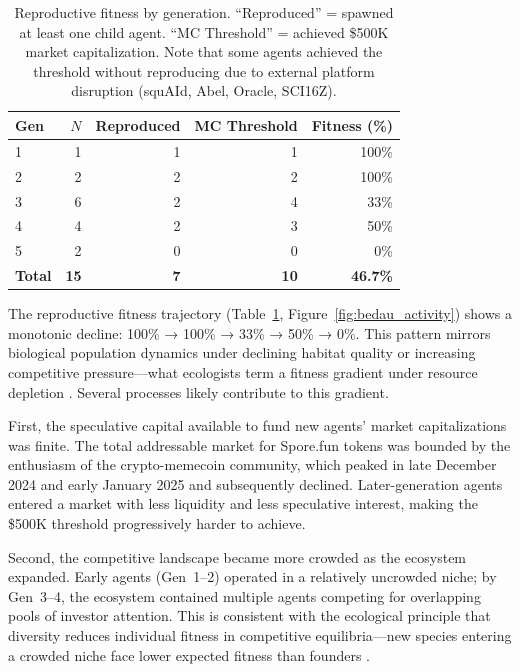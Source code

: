 \begin{table}[ht]
\centering
\caption{Reproductive fitness by generation. ``Reproduced'' = spawned at least one child agent. ``MC Threshold'' = achieved \$500K market capitalization. Note that some agents achieved the threshold without reproducing due to external platform disruption (squAId, Abel, Oracle, SCI16Z).}
\label{tab:rep-fitness}
\small
\begin{tabular}{lrrrr}
\toprule
Gen & $N$ & Reproduced & MC Threshold & Fitness (\%) \\
\midrule
1 & 1 & 1 & 1 & 100\% \\
2 & 2 & 2 & 2 & 100\% \\
3 & 6 & 2 & 4 & 33\% \\
4 & 4 & 2 & 3 & 50\% \\
5 & 2 & 0 & 0 & 0\% \\
\midrule
\textbf{Total} & \textbf{15} & \textbf{7} & \textbf{10} & \textbf{46.7\%} \\
\bottomrule
\end{tabular}
\end{table}

The reproductive fitness trajectory (Table~\ref{tab:rep-fitness}, Figure~\ref{fig:bedau_activity}) shows a monotonic decline: 100\% → 100\% → 33\% → 50\% → 0\%. This pattern mirrors biological population dynamics under declining habitat quality or increasing competitive pressure---what ecologists term a fitness gradient under resource depletion \cite{Stearns1992}. Several processes likely contribute to this gradient.

First, the speculative capital available to fund new agents' market capitalizations was finite. The total addressable market for Spore.fun tokens was bounded by the enthusiasm of the crypto-memecoin community, which peaked in late December 2024 and early January 2025 and subsequently declined. Later-generation agents entered a market with less liquidity and less speculative interest, making the \$500K threshold progressively harder to achieve.

Second, the competitive landscape became more crowded as the ecosystem expanded. Early agents (Gen~1--2) operated in a relatively uncrowded niche; by Gen~3--4, the ecosystem contained multiple agents competing for overlapping pools of investor attention. This is consistent with the ecological principle that diversity reduces individual fitness in competitive equilibria---new species entering a crowded niche face lower expected fitness than founders \cite{Stearns1992}.

